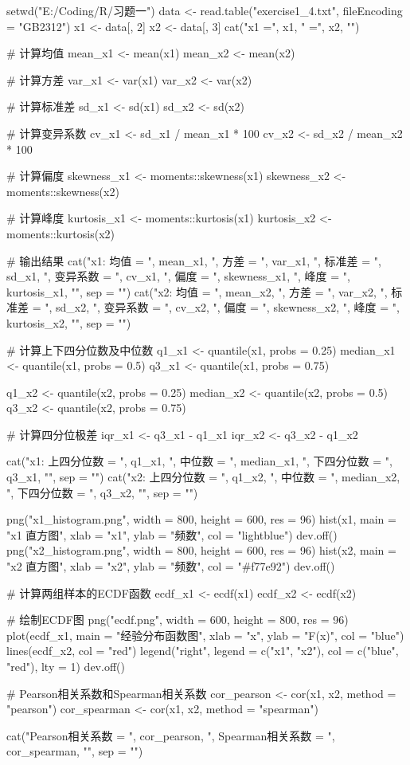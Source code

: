 \documentclass[12pt, a4paper, oneside]{ctexart}
\begin{document}
\begin{rcode}
setwd("E:/Coding/R/习题一")
data <- read.table("exercise1_4.txt", fileEncoding = "GB2312")
x1 <- data[, 2]
x2 <- data[, 3]
cat("x1 =", x1, " =", x2, "\n")

# 计算均值
mean_x1 <- mean(x1)
mean_x2 <- mean(x2)

# 计算方差
var_x1 <- var(x1)
var_x2 <- var(x2)

# 计算标准差
sd_x1 <- sd(x1)
sd_x2 <- sd(x2)

# 计算变异系数
cv_x1 <- sd_x1 / mean_x1 * 100
cv_x2 <- sd_x2 / mean_x2 * 100

# 计算偏度
skewness_x1 <- moments::skewness(x1)
skewness_x2 <- moments::skewness(x2)

# 计算峰度
kurtosis_x1 <- moments::kurtosis(x1)
kurtosis_x2 <- moments::kurtosis(x2)

# 输出结果
cat("x1: 均值 = ", mean_x1, ", 方差 = ", var_x1, ", 标准差 = ", sd_x1,
    ", 变异系数 = ", cv_x1, ", 偏度 = ", skewness_x1, ", 峰度 = ", kurtosis_x1,
    "\n", sep = "")
cat("x2: 均值 = ", mean_x2, ", 方差 = ", var_x2, ", 标准差 = ", sd_x2,
    ", 变异系数 = ", cv_x2, ", 偏度 = ", skewness_x2, ", 峰度 = ", kurtosis_x2,
    "\n", sep = "")


# 计算上下四分位数及中位数
q1_x1 <- quantile(x1, probs = 0.25)
median_x1 <- quantile(x1, probs = 0.5)
q3_x1 <- quantile(x1, probs = 0.75)

q1_x2 <- quantile(x2, probs = 0.25)
median_x2 <- quantile(x2, probs = 0.5)
q3_x2 <- quantile(x2, probs = 0.75)

# 计算四分位极差
iqr_x1 <- q3_x1 - q1_x1
iqr_x2 <- q3_x2 - q1_x2

cat("x1: 上四分位数 = ", q1_x1, ", 中位数 = ", median_x1, ", 下四分位数 = ", q3_x1,
    "\n", sep = "")
cat("x2: 上四分位数 = ", q1_x2, ", 中位数 = ", median_x2, ", 下四分位数 = ", q3_x2,
    "\n", sep = "")

png("x1_histogram.png", width = 800, height = 600, res = 96)
hist(x1, main = "x1 直方图", xlab = "x1", ylab = "频数", col = "lightblue")
dev.off()
png("x2_histogram.png", width = 800, height = 600, res = 96)
hist(x2, main = "x2 直方图", xlab = "x2", ylab = "频数", col = "#f77e92")
dev.off()

# 计算两组样本的ECDF函数
ecdf_x1 <- ecdf(x1)
ecdf_x2 <- ecdf(x2)

# 绘制ECDF图
png("ecdf.png", width = 600, height = 800, res = 96)
plot(ecdf_x1, main = "经验分布函数图", xlab = "x", ylab = "F(x)", col = "blue")
lines(ecdf_x2, col = "red")
legend("right", legend = c("x1", "x2"), col = c("blue", "red"), lty = 1)
dev.off()

# Pearson相关系数和Spearman相关系数
cor_pearson <- cor(x1, x2, method = "pearson")
cor_spearman <- cor(x1, x2, method = "spearman")

cat("Pearson相关系数 = ", cor_pearson, ", Spearman相关系数 = ", cor_spearman,
    "\n", sep = "")
\end{rcode}
\end{document}

